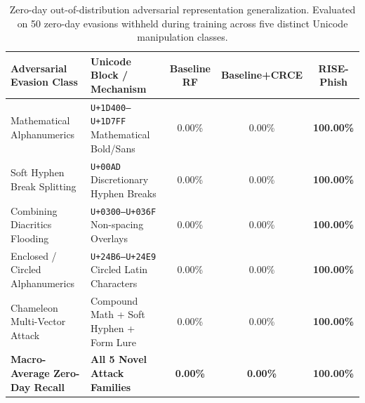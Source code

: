 \documentclass{article}
\begin{document}
\begin{table}[t]
\centering
\small
\caption{Zero-day out-of-distribution adversarial representation generalization. Evaluated on 50 zero-day evasions withheld during training across five distinct Unicode manipulation classes.}
\label{tab:unseen_attacks}
\begin{tabular}{llccc}
\toprule
\textbf{Adversarial Evasion Class} & \textbf{Unicode Block / Mechanism} & \textbf{Baseline RF} & \textbf{Baseline+CRCE} & \textbf{RISE-Phish} \\
\midrule
Mathematical Alphanumerics  & \texttt{U+1D400--U+1D7FF} Mathematical Bold/Sans  & 0.00\% & 0.00\% & \textbf{100.00\%} \\
Soft Hyphen Break Splitting & \texttt{U+00AD} Discretionary Hyphen Breaks        & 0.00\% & 0.00\% & \textbf{100.00\%} \\
Combining Diacritics Flooding & \texttt{U+0300--U+036F} Non-spacing Overlays     & 0.00\% & 0.00\% & \textbf{100.00\%} \\
Enclosed / Circled Alphanumerics & \texttt{U+24B6--U+24E9} Circled Latin Characters & 0.00\% & 0.00\% & \textbf{100.00\%} \\
Chameleon Multi-Vector Attack & Compound Math + Soft Hyphen + Form Lure          & 0.00\% & 0.00\% & \textbf{100.00\%} \\
\midrule
\textbf{Macro-Average Zero-Day Recall} & \textbf{All 5 Novel Attack Families}    & \textbf{0.00\%} & \textbf{0.00\%} & \textbf{100.00\%} \\
\bottomrule
\end{tabular}
\end{table}
\end{document}
